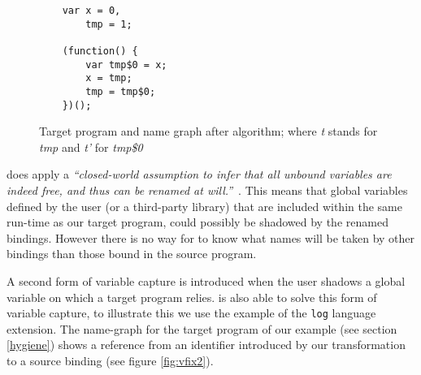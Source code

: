 \begin{figure}[h]
\centering
\begin{minipage}{0.25\linewidth}
\begin{lstlisting}
	var x = 0,
		tmp = 1;

	(function() {
		var tmp$0 = x;
		x = tmp;
		tmp = tmp$0;
	})();
\end{lstlisting}
\end{minipage}
\hfill
\begin{minipage}{0.65\linewidth}
\end{minipage}

\caption{Target program and name graph after \textit{\vfix} algorithm; where \textit{t} stands for \textit{tmp} and \textit{t'} for \textit{tmp\$0}} \label{fig:name-graph-fixed}
\end{figure}

\textit{\vfix} does apply a \textit{``closed-world assumption to infer that all unbound variables are indeed free, and thus can be renamed at will.''}~\cite{Erdweg2014}. This means that global variables defined by the user (or a third-party library) that are included within the same run-time as our target program, could possibly be shadowed by the renamed bindings. However there is no way for \textit{\vfix} to know what names will be taken by other bindings than those bound in the source program.

A second form of variable capture is introduced when the user shadows a global variable on which a target program relies. \textit{\vfix} is also able to solve this form of variable capture, to illustrate this we use the example of the \lstinline$log$ language extension. The name-graph for the target program of our example (see section \ref{hygiene}) shows a reference from an identifier introduced by our transformation to a source binding (see figure \ref{fig:vfix2}).


